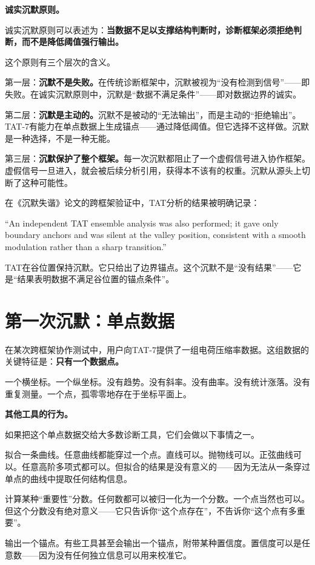 \documentclass[11pt,a4paper]{book}
\theoremstyle{definition}
\begin{document}
\textbf{诚实沉默原则。}

诚实沉默原则可以表述为：\textbf{当数据不足以支撑结构判断时，诊断框架必须拒绝判断，而不是降低阈值强行输出。}

这个原则有三个层次的含义。

第一层：\textbf{沉默不是失败。}在传统诊断框架中，沉默被视为“没有检测到信号”——即失败。在诚实沉默原则中，沉默是“数据不满足条件”——即对数据边界的诚实。

第二层：\textbf{沉默是主动的。}沉默不是被动的“无法输出”，而是主动的“拒绝输出”。TAT-7有能力在单点数据上生成锚点——通过降低阈值。但它选择不这样做。沉默是一种选择，不是一种无能。

第三层：\textbf{沉默保护了整个框架。}每一次沉默都阻止了一个虚假信号进入协作框架。虚假信号一旦进入，就会被后续分析引用，获得本不该有的权重。沉默从源头上切断了这种可能性。

在《沉默失谐》论文的跨框架验证中，TAT分析的结果被明确记录：

“An independent TAT ensemble analysis was also performed; it gave only boundary anchors and was silent at the valley position, consistent with a smooth modulation rather than a sharp transition.”

TAT在谷位置保持沉默。它只给出了边界锚点。这个沉默不是“没有结果”——它是“结果表明数据不满足谷位置的锚点条件”。

\section{第一次沉默：单点数据}

在某次跨框架协作测试中，用户向TAT-7提供了一组电荷压缩率数据。这组数据的关键特征是：\textbf{只有一个数据点。}

一个横坐标。一个纵坐标。没有趋势。没有斜率。没有曲率。没有统计涨落。没有重复测量。一个点，孤零零地存在于坐标平面上。

\textbf{其他工具的行为。}

如果把这个单点数据交给大多数诊断工具，它们会做以下事情之一。

拟合一条曲线。任意曲线都能穿过一个点。直线可以。抛物线可以。正弦曲线可以。任意高阶多项式都可以。但拟合的结果是没有意义的——因为无法从一条穿过单点的曲线中提取任何结构信息。

计算某种“重要性”分数。任何数都可以被归一化为一个分数。一个点当然也可以。但这个分数没有绝对意义——它只告诉你“这个点存在”，不告诉你“这个点有多重要”。

输出一个锚点。有些工具甚至会输出一个锚点，附带某种置信度。置信度可以是任意数——因为没有任何独立信息可以用来校准它。
\end{document}
